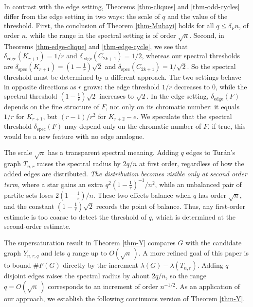 \documentclass[11pt,a4paper]{article}
\theoremstyle{definition}
\theoremstyle{plain}
\renewcommand{\le}{\leqslant}
\begin{document}
In contrast with the edge setting, 
Theorems \ref{thm-cliques} and \ref{thm-odd-cycles} differ from the edge setting in two ways: the scale of 
$q$ and the value of the threshold. 
First, the conclusion of Theorem \ref{thm-Mubayi} holds for all $q\le \delta_F n$, of order $n$, while the range in the spectral setting is of order $\sqrt n$. Second, in Theorems \ref{thm-edge-clique} and \ref{thm-edge-cycle}, we see that 
$\delta_{\mathrm{edge}}(K_{r+1})=1/r$ and
$\delta_{\mathrm{edge}}(C_{2k+1})=1/2$, whereas our
spectral thresholds are $\delta_{\mathrm{spec}}(K_{r+1}) = (1- \frac{1}{r})\sqrt2$ and $\delta_{\mathrm{spec}}(C_{2k+1}) = 1/\sqrt2$.
So the spectral threshold must be determined by a  different approach. 
The two settings behave in opposite directions as $r$ grows: the edge threshold
$1/r$ decreases to $0$, while the spectral threshold
$(1- \frac{1}{r})\sqrt2$ increases to $\sqrt2$.  
 In the edge setting, 
$\delta_{\mathrm{edge}}(F)$ depends on the fine structure of $F$, not only on
its chromatic number: it equals $1/r$ for $K_{r+1}$,  but $(r-1)/r^2$ for 
$K_{r+2}-e$. We speculate that the spectral threshold  $\delta_{\mathrm{spec}}(F)$ may depend only on the chromatic number of $F$, if true, this would be a new 
feature with no edge analogue. 

\smallskip 
The scale $\sqrt n$ has a transparent spectral
meaning. Adding $q$ edges to Tur\'{a}n's graph $T_{n,r}$ raises the spectral radius by ${2q}/{n}$ at first order,
regardless of how the added edges are distributed. 
{\it The distribution becomes visible only at second order term}, where a star gains an extra
${q^2 (1- \frac{1}{r})^{-1}}/{n^2}$, while an unbalanced
pair of partite sets loses ${2 (1- \frac{1}{r})}/{n}$. These two effects balance when $q$ has order $\sqrt n$, and
the constant $(1-\tfrac1r)\sqrt2$ records the
point of balance. Thus, any first-order estimate is too coarse to detect the threshold of $q$, which is determined 
at the second-order estimate. 


\smallskip 
The supersaturation result in Theorem \ref{thm-Y} compares $G$ with the candidate graph $Y_{n,r,q}$ and
lets $q$ range up to $O(\sqrt{n}\,)$.  
A more refined goal of this paper is to bound
$\texttt{\#}F(G)$ directly by the increment 
$\lambda(G)-\lambda(T_{n,r})$. Adding $q$ disjoint edges raises the spectral radius 
by about $2q/n$, so the range
$q=O(\sqrt n\,)$ corresponds to an increment of order
${n}^{-1/2}$. As an application of our approach, we establish the following continuous version of Theorem \ref{thm-Y}. 
\end{document}
